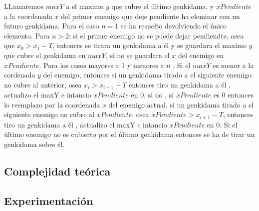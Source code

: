         LLamaremos $maxY$ a el maximo $y$ que cubre el último genkidama, y $xPendiente$ a la coordenada $x$ del primer enemigo que deje pendiente ha eleminar con un futuro genkidama.
        Para el caso $n = 1$ se ha resuelto devolviendo el único elemento. Para $n > 2$: si el primer enemigo no se puede dejar pendiendte, osea que $x_0 > x_1  - T$, entonces se tirara un genkidama a él y se guardara el maximo $y$ que cubre el genkidama en $maxY$, si no se guardara el $x$ del enemigo en $xPendiente$. Para los casos mayores a 1 y menores a $n$ , Si el $maxY$ es menor a la cordenada $y$ del enemigo, entonces si un genkidama tirado a el siguiente enemigo no cubre al anterior, osea $x_i > x_{i+1} - T$  entonces tiro un genkidama a él , actualizo el maxY e intancio $xPendiente$ en $0$, si no , si $xPendiente$ es $0$ entonces lo reemplazo por la coordenada $x$ del enemigo actual, si un genkidama tirado a el siguiente enemigo no cubre al $xPendiente$, osea  $xPendiente> x_{i+1} - T$, entonces tiro un genkidama a él , actualizo el maxY e intancio $xPendiente$ en $0$. Si el último enemigo no es cubierto por el último genkidama entonces se ha de tirar un genkidama sobre él.



       
    \subsection{Complejidad teórica}
         
       


    \subsection{Experimentación}
